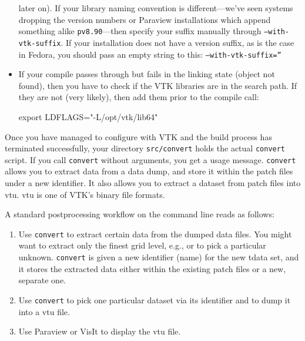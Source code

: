 \begin{itemize}
  later on). If your library naming convention is different---we've seen
  systems dropping the version numbers or Paraview installations which append
  something alike \texttt{pv8.90}---then specify your suffix manually through
  \texttt{--with-vtk-suffix}. If your installation does not have a version suffix,
  as is the case in Fedora, you should pass an empty string to this:
  \texttt{--with-vtk-suffix=''}
  \item If your compile passes through but fails in the linking state (object
  not found), then you have to check if the VTK libraries are in the search
  path. If they are not (very likely), then add them prior to the compile call:
\begin{code}
export LDFLAGS="-L/opt/vtk/lib64"
\end{code}
\end{itemize}


\noindent
Once you have managed to configure with VTK and the build process has terminated
successfully, your directory \texttt{src/convert} holds the actual \texttt{convert}
script.
If you call \texttt{convert} without arguments, you get a usage message.
\texttt{convert} allows you to extract data from a data dump, and store it
within the patch files under a new identifier.
It also allows you to extract a dataset from patch files into vtu.
vtu is one of VTK's binary file formats.


A standard postprocessing workflow on the command line reads as follows:
\begin{enumerate}
  \item Use \texttt{convert} to extract certain data from the dumped data files.
  You might want to extract only the finest grid level, e.g., or to pick a
  particular unknown. \texttt{convert} is given a new identifier (name) for the
  new tdata set, and it stores the extracted data either within the existing
  patch files or a new, separate one.
  \item Use \texttt{convert} to pick one particular dataset via its identifier
  and to dump it into a vtu file.
  \item Use Paraview or VisIt to display the vtu file.
\end{enumerate}



